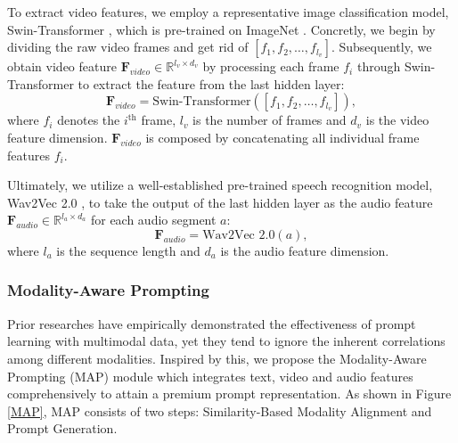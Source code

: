 \documentclass[letterpaper]{article}
\begin{document}
To extract video features, we employ a representative image classification model, Swin-Transformer \cite{Liu_2021_ICCV}, which is pre-trained on ImageNet \cite{5206848}. Concretly, we begin by dividing the raw video frames and get rid of   $[f_{1}, f_{2}, \dots, f_{l_{v}}]$. Subsequently, we obtain video feature $\textbf{F}_{video} \in \mathbb{R}^{l_{v} \times d_{v}}$ by processing each frame $f_{i}$ through Swin-Transformer to extract the feature from the last hidden layer:
\begin{equation}
\textbf{F}_{video} = \text{Swin-Transformer}([f_{1}, f_{2}, \dots, f_{l_{v}}]),
\end{equation}
where $f_{i}$ denotes the $i^{\text{th}}$ frame, $l_{v}$ is the number of frames and $d_{v}$ is the video feature dimension. $\textbf{F}_{video}$ is composed by concatenating all individual frame features $f_{i}$.

Ultimately, we utilize a well-established pre-trained speech recognition model, Wav2Vec 2.0 \cite{NEURIPS2020_92d1e1eb}, to take the output of the last hidden layer as the audio feature $\textbf{F}_{audio} \in \mathbb{R}^{l_{a} \times d_{a}}$ for each audio segment $a$:
\begin{equation}
\textbf{F}_{audio} = \text{Wav2Vec 2.0}(a),
\end{equation}
where $l_{a}$ is the sequence length and $d_{a}$ is the audio feature dimension.


\subsubsection{Modality-Aware Prompting}

Prior researches \cite{zhou2022learning,zhou2022conditional,rao2022denseclip} have empirically demonstrated the effectiveness of prompt learning with multimodal data, yet they tend to ignore the inherent correlations among different modalities. Inspired by this, we propose the Modality-Aware Prompting (MAP) module which integrates text, video and audio features comprehensively to attain a premium prompt representation. As shown in Figure \ref{MAP}, MAP consists of two steps: Similarity-Based Modality Alignment and Prompt Generation.
\end{document}
